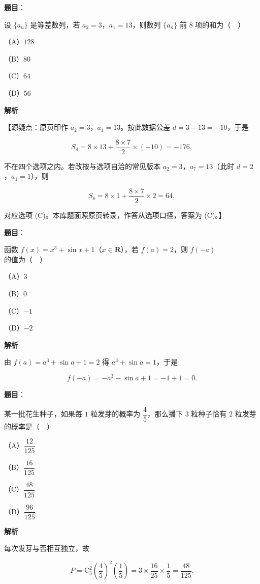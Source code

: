 \begin{answer}

\textbf{题目}：

设 $\{a_n\}$ 是等差数列，若 $a_2=3$，$a_1=13$，则数列 $\{a_n\}$ 前 $8$ 项的和为（　）

（A）$128$

（B）$80$

（C）$64$

（D）$56$

\textbf{解析}

【源疑点：原页印作 $a_2=3$，$a_1=13$。按此数据公差 $d=3-13=-10$，于是

\nopagebreak[4]
\[S_8=8\times13+\frac{8\times7}2\times(-10)=-176,\]

不在四个选项之内。若改按与选项自洽的常见版本 $a_2=3$，$a_7=13$（此时 $d=2$，$a_1=1$），则

\nopagebreak[4]
\[S_8=8\times1+\frac{8\times7}2\times2=64,\]

对应选项 (C)。本库题面照原页转录，作答从选项口径，答案为 (C)。】


\end{answer}
\begin{answer}

\textbf{题目}：

函数 $f(x)=x^3+\sin x+1$（$x\in\mathbf R$），若 $f(a)=2$，则 $f(-a)$ 的值为（　）

（A）$3$

（B）$0$

（C）$-1$

（D）$-2$

\textbf{解析}

由 $f(a)=a^3+\sin a+1=2$ 得 $a^3+\sin a=1$，于是

\nopagebreak[4]
\[f(-a)=-a^3-\sin a+1=-1+1=0.\]


\end{answer}
\begin{answer}

\textbf{题目}：

某一批花生种子，如果每 $1$ 粒发芽的概率为 $\dfrac45$，那么播下 $3$ 粒种子恰有 $2$ 粒发芽的概率是（　）

（A）$\dfrac{12}{125}$

（B）$\dfrac{16}{125}$

（C）$\dfrac{48}{125}$

（D）$\dfrac{96}{125}$

\textbf{解析}

每次发芽与否相互独立，故

\nopagebreak[4]
\[P=\mathrm C_3^2\left(\frac45\right)^2\left(\frac15\right)=3\times\frac{16}{25}\times\frac15=\frac{48}{125}.\]


\end{answer}

